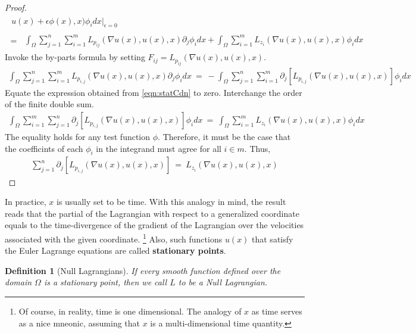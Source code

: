 \documentclass[10pt]{article}
\numberwithin{equation}{section}
\newtheorem{definition}{Definition}
\numberwithin{theorem}{section}
\numberwithin{proposition}{section}
\numberwithin{lemma}{section}
\numberwithin{corollary}{section}
\numberwithin{remark}{section}
\numberwithin{definition}{section}
\numberwithin{example}{section}
\numberwithin{conjecture}{section}
\numberwithin{question}{section}
\begin{document}
\begin{proof}
\begin{align}
\begin{split}
        u(x) + \epsilon \phi(x), x) \phi_i dx \bigg|_{\epsilon = 0}
        \end{split} \nonumber \\ \label{eqn:statCdn}
         = \  \begin{split}
        \int_\Omega \sum_{j = 1}^n \sum_{i = 1}^m L_{p_{ij}}(\nabla u(x) , 
        u(x), x) \partial_j \phi_i dx 
        + \int_{\Omega} \sum_{i = 1}^m L_{z_i}(\nabla u(x)  , 
        u(x) , x) \phi_i dx
        \end{split}
    \end{align}
    Invoke the by-parts formula by setting $F_{ij} = L_{p_{ij}}(\nabla u(x), u(x), x)$. 
    \begin{align}
        \int_{\Omega} \sum_{j = 1}^n \sum_{i = 1}^m 
        L_{p_{i, j}} (\nabla u(x), u(x), x) \partial_j \phi_i dx
        \ = \ -\int_{\Omega} \sum_{j = 1}^n \sum_{i = 1}^m \partial_j 
        \left[
            L_{p_{i, j}}(\nabla u(x), u(x), x) 
        \right]\phi_i dx
    \end{align}
    Equate the expression obtained from \eqref{eqn:statCdn} to zero. 
    Interchange the order of the finite double sum. 
    \begin{align}
        \int_{\Omega} \sum_{i = 1}^m \sum_{j = 1}^n \partial_j 
        \left[
            L_{p_{i, j}}(\nabla u(x), u(x), x) 
        \right]\phi_i dx 
        \ = \ 
        \int_{\Omega} \sum_{i = 1}^m L_{z_i}(\nabla u(x)  , 
        u(x) , x) \phi_i dx
    \end{align}
    The equality holds for any test function $\phi$. Therefore, it 
    must be the case that the coefficints of each $\phi_i$ in the integrand 
    must agree for all $i \in m$. Thus, 
    \begin{align}
        \sum_{j = 1}^n \partial_j \left[
            L_{p_{i, j}}(\nabla u(x), u(x), x)
        \right] \ = \ L_{z_i} (\nabla u(x), u(x), x)
    \end{align}
\end{proof}

    In practice, $x$ is usually set to be time. With this analogy in 
    mind, the result reads that the partial of the Lagrangian 
    with respect to a generalized coordinate equals to 
    the time-divergence of the gradient of the Lagrangian 
    over the velocities associated 
    with the given coordinate. \footnote{
        Of course, in reality, time is one dimensional. The analogy of 
        $x$ as time serves as a nice mneonic, assuming that $x$ is 
        a multi-dimensional time quantity. 
    }
    Also, such functions $u(x)$ that satisfy the Euler Lagrange equations 
    are called \textbf{stationary points}. 
\begin{definition}[Null Lagrangians]
    If every smooth function defined over the domain $\Omega$ 
    is a stationary point, then we call $L$ to be a Null Lagrangian. 
\end{definition}
\end{document}

